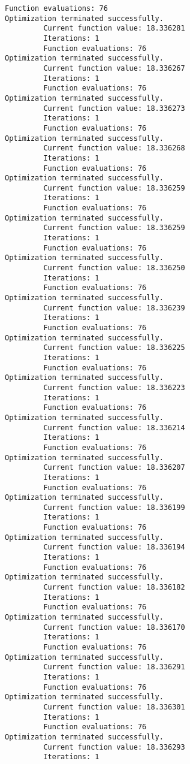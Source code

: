 \documentclass[11pt]{article}
\begin{document}
\begin{Verbatim}[commandchars=\\\{\}]
         Function evaluations: 76
Optimization terminated successfully.
         Current function value: 18.336281
         Iterations: 1
         Function evaluations: 76
Optimization terminated successfully.
         Current function value: 18.336267
         Iterations: 1
         Function evaluations: 76
Optimization terminated successfully.
         Current function value: 18.336273
         Iterations: 1
         Function evaluations: 76
Optimization terminated successfully.
         Current function value: 18.336268
         Iterations: 1
         Function evaluations: 76
Optimization terminated successfully.
         Current function value: 18.336259
         Iterations: 1
         Function evaluations: 76
Optimization terminated successfully.
         Current function value: 18.336259
         Iterations: 1
         Function evaluations: 76
Optimization terminated successfully.
         Current function value: 18.336250
         Iterations: 1
         Function evaluations: 76
Optimization terminated successfully.
         Current function value: 18.336239
         Iterations: 1
         Function evaluations: 76
Optimization terminated successfully.
         Current function value: 18.336225
         Iterations: 1
         Function evaluations: 76
Optimization terminated successfully.
         Current function value: 18.336223
         Iterations: 1
         Function evaluations: 76
Optimization terminated successfully.
         Current function value: 18.336214
         Iterations: 1
         Function evaluations: 76
Optimization terminated successfully.
         Current function value: 18.336207
         Iterations: 1
         Function evaluations: 76
Optimization terminated successfully.
         Current function value: 18.336199
         Iterations: 1
         Function evaluations: 76
Optimization terminated successfully.
         Current function value: 18.336194
         Iterations: 1
         Function evaluations: 76
Optimization terminated successfully.
         Current function value: 18.336182
         Iterations: 1
         Function evaluations: 76
Optimization terminated successfully.
         Current function value: 18.336170
         Iterations: 1
         Function evaluations: 76
Optimization terminated successfully.
         Current function value: 18.336291
         Iterations: 1
         Function evaluations: 76
Optimization terminated successfully.
         Current function value: 18.336301
         Iterations: 1
         Function evaluations: 76
Optimization terminated successfully.
         Current function value: 18.336293
         Iterations: 1

\end{Verbatim}
\end{document}
